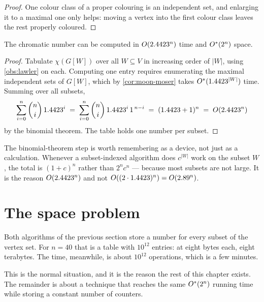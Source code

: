 \begin{proof}
One colour class of a proper colouring is an independent set, and enlarging it
to a maximal one only helps: moving a vertex into the first colour class leaves
the rest properly coloured.
\end{proof}

\begin{theorem}\label{thm:lawler}
The chromatic number can be computed in $O\!\left(2.4423^n\right)$ time and
$O^{*}(2^n)$ space.
\end{theorem}

\begin{proof}
Tabulate $\chi(G[W])$ over all $W \subseteq V$ in increasing order of $|W|$,
using \cref{obs:lawler} on each. Computing one entry requires enumerating the
maximal independent sets of $G[W]$, which by \cref{cor:moon-moser} takes
$O^{*}(1.4423^{|W|})$ time. Summing over all subsets,
\[ \sum_{i=0}^{n} \binom{n}{i} \, 1.4423^{i}
   \;=\; \sum_{i=0}^{n} \binom{n}{i} \, 1.4423^{i}\, 1^{\,n-i}
   \;=\; (1.4423 + 1)^n \;=\; O\!\left(2.4423^n\right) \]
by the binomial theorem. The table holds one number per subset.
\end{proof}

\begin{intuition}
The binomial-theorem step is worth remembering as a device, not just as a
calculation. Whenever a subset-indexed algorithm does $c^{|W|}$ work on the
subset $W$, the total is $(1+c)^n$ rather than $2^n c^n$ --- because most
subsets are not large. It is the reason $O\!\left(2.4423^n\right)$ and not
$O\!\left((2 \cdot 1.4423)^n\right) = O\!\left(2.89^n\right)$.
\end{intuition}

\section{The space problem}
\label{sec:space-problem}

Both algorithms of the previous section store a number for every subset of the
vertex set. For $n = 40$ that is a table with $10^{12}$ entries: at eight bytes
each, eight terabytes. The time, meanwhile, is about $10^{12}$ operations, which
is a few minutes.

This is the normal situation, and it is the reason the rest of this chapter
exists. The remainder is about a technique that reaches the same $O^{*}(2^n)$
running time while storing a constant number of counters.

